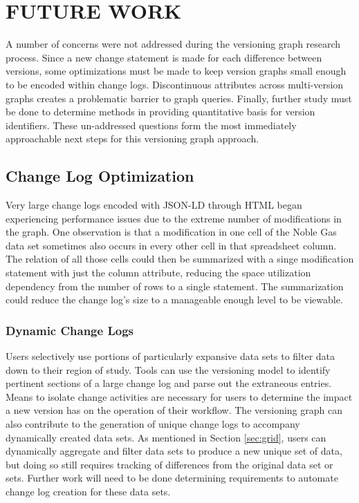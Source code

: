 
\chapter{FUTURE WORK}\label{ch:future}

A number of concerns were not addressed during the versioning graph research process.
Since a new change statement is made for each difference between versions, some optimizations must be made to keep version graphs small enough to be encoded within change logs.
Discontinuous attributes across multi-version graphs creates a problematic barrier to graph queries.
Finally, further study must be done to determine methods in providing quantitative basis for version identifiers.
These un-addressed questions form the most immediately approachable next steps for this versioning graph approach.

\section{Change Log Optimization}

Very large change logs encoded with JSON-LD through HTML began experiencing performance issues due to the extreme number of modifications in the graph.
One observation is that a modification in one cell of the Noble Gas data set sometimes also occurs in every other cell in that spreadsheet column.
The relation of all those cells could then be summarized with a singe modification statement with just the column attribute, reducing the space utilization dependency from the number of rows to a single statement.
The summarization could reduce the change log's size to a manageable enough level to be viewable.

\subsection{Dynamic Change Logs}

Users selectively use portions of particularly expansive data sets to filter data down to their region of study. 
Tools can use the versioning model to identify pertinent sections of a large change log and parse out the extraneous entries.
Means to isolate change activities are necessary for users to determine the impact a new version has on the operation of their workflow.
The versioning graph can also contribute to the generation of unique change logs to accompany dynamically created data sets.
As mentioned in Section \ref{sec:grid}, users can dynamically aggregate and filter data sets to produce a new unique set of data, but doing so still requires tracking of differences from the original data set or sets.
Further work will need to be done determining requirements to automate change log creation for these data sets.

